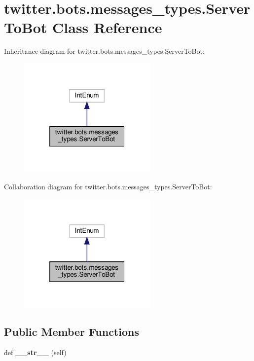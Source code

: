 \hypertarget{classtwitter_1_1bots_1_1messages__types_1_1ServerToBot}{}\section{twitter.\+bots.\+messages\+\_\+types.\+Server\+To\+Bot Class Reference}
\label{classtwitter_1_1bots_1_1messages__types_1_1ServerToBot}


Inheritance diagram for twitter.\+bots.\+messages\+\_\+types.\+Server\+To\+Bot\+:\nopagebreak
\begin{figure}[H]
\begin{center}
\leavevmode
\includegraphics[width=193pt]{classtwitter_1_1bots_1_1messages__types_1_1ServerToBot__inherit__graph}
\end{center}
\end{figure}


Collaboration diagram for twitter.\+bots.\+messages\+\_\+types.\+Server\+To\+Bot\+:\nopagebreak
\begin{figure}[H]
\begin{center}
\leavevmode
\includegraphics[width=193pt]{classtwitter_1_1bots_1_1messages__types_1_1ServerToBot__coll__graph}
\end{center}
\end{figure}
\subsection*{Public Member Functions}
\begin{DoxyCompactItemize}
\item 
\mbox{\label{classtwitter_1_1bots_1_1messages__types_1_1ServerToBot_a985e5ee49b6d8aec3555283ca6bf2f28}} 
def {\bfseries \+\_\+\+\_\+str\+\_\+\+\_\+} (self)
\end{DoxyCompactItemize}
